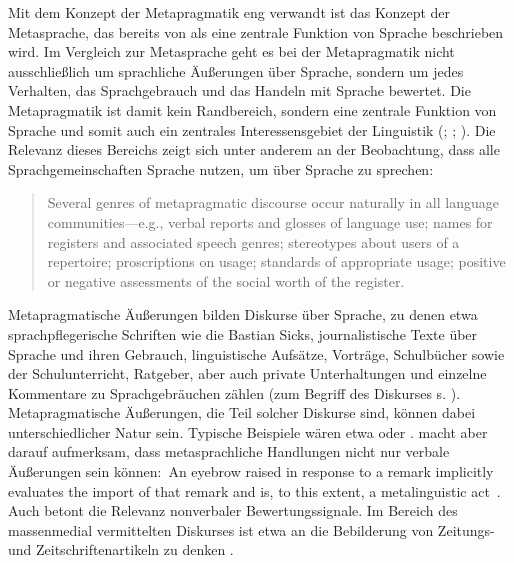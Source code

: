 Mit dem Konzept der Metapragmatik eng verwandt ist das Konzept der Metasprache, das bereits von \citet[]{Jakobson.1960} als eine zentrale Funktion von Sprache beschrieben wird. 
Im Vergleich zur Metasprache  geht es bei der Metapragmatik nicht ausschließlich um sprachliche Äußerungen über Sprache, sondern um jedes Verhalten, das Sprachgebrauch und das Handeln mit Sprache bewertet.
Die Metapragmatik ist damit kein Randbereich, sondern eine zentrale Funktion von Sprache und somit auch ein zentrales Interessensgebiet der Linguistik (\citealp[s.][1--2]{Cameron1995}; \citealp[3]{Jaworski.2004}; \citealp[113]{Gal.2016}). 
Die Relevanz dieses Bereichs zeigt sich unter anderem an der Beobachtung, dass alle Sprachgemeinschaften Sprache nutzen, um über Sprache zu sprechen: 
\begin{quote}Several genres of metapragmatic discourse occur naturally in all language communities---e.g., verbal reports and glosses of language use; names for registers and associated speech genres; stereotypes about users of a repertoire; proscriptions on usage; standards of appropriate usage; positive or negative assessments of the social worth of the register.~\citep[][217]{Agha.1999}\end{quote}
Metapragmatische Äußerungen bilden Diskurse über Sprache, zu denen etwa sprachpflegerische Schriften wie die Bastian Sicks, journalistische Texte über Sprache und ihren Gebrauch, linguistische Aufsätze, Vorträge, Schulbücher sowie der Schulunterricht, Ratgeber, aber auch private Unterhaltungen und einzelne Kommentare zu Sprachgebräuchen zählen (zum Begriff des Diskurses s. \citealp{Foucault.1974}). 
Metapragmatische Äußerungen, die Teil solcher Diskurse sind, können dabei unterschiedlicher Natur sein. 
Typische Beispiele wären etwa  oder . 
\citeauthor{Agha2007} macht aber darauf aufmerksam, dass metasprachliche Handlungen nicht nur verbale {\"A}u{\ss}erungen sein k{\"o}nnen:~{\glqq}An eyebrow raised in response to a remark implicitly evaluates the import of that remark and is, to this extent, a metalinguistic act{\grqq}~\citep[17]{Agha2007}. 
Auch \citet[21]{Konig.2017} betont die Relevanz nonverbaler Bewertungssignale. 
Im Bereich des massenmedial vermittelten Diskurses ist etwa an die Bebilderung von Zeitungs- und Zeitschriftenartikeln zu denken \citep[s.][]{Spitzmuller.2007}. 

